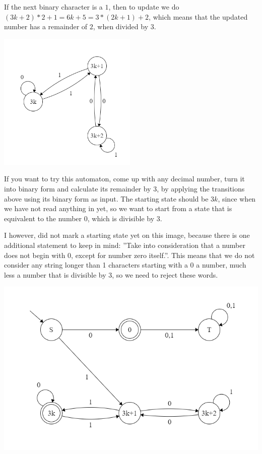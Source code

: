 If the next binary character is a $1$, then to update we do $(3k+2)*2+1=6k+5=3*(2k+1)+2$, which means that the updated number has a remainder of $2$, when divided by $3$.

\includegraphics[width=250px]{02/modulo_3.png}

If you want to try this automaton, come up with any decimal number, turn it into binary form and calculate its remainder by $3$, by applying the transitions above using its binary form as input. The starting state should be $3k$, since when we have not read anything in yet, so we want to start from a state that is equivalent to the number $0$, which is divisible by $3$.

I however, did not mark a starting state yet on this image, because there is one additional statement to keep in mind: ''Take into consideration that
a number does not begin with $0$, except for number zero itself.''. This means that we do not consider any string longer than 1 characters starting with a $0$ a number, much less a number that is divisible by $3$, so we need to reject these words.

\includegraphics[width=\linewidth]{02/modulo_final.png}

